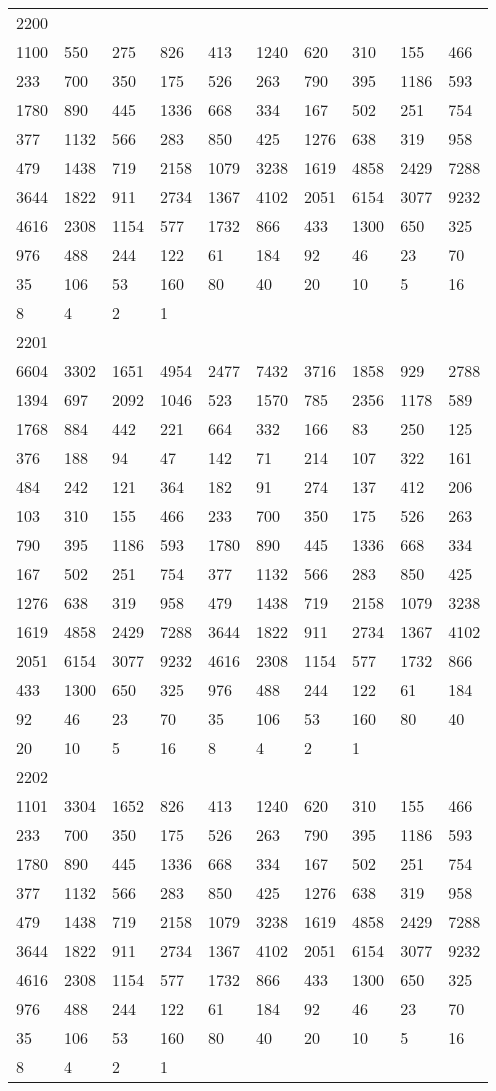 \begin{longtable}{*{10}{l}}
2200&&&&&&&&&\\
1100& 550& 275& 826& 413& 1240& 620& 310& 155& 466\\
233& 700& 350& 175& 526& 263& 790& 395& 1186& 593\\
1780& 890& 445& 1336& 668& 334& 167& 502& 251& 754\\
377& 1132& 566& 283& 850& 425& 1276& 638& 319& 958\\
479& 1438& 719& 2158& 1079& 3238& 1619& 4858& 2429& 7288\\
3644& 1822& 911& 2734& 1367& 4102& 2051& 6154& 3077& 9232\\
4616& 2308& 1154& 577& 1732& 866& 433& 1300& 650& 325\\
976& 488& 244& 122& 61& 184& 92& 46& 23& 70\\
35& 106& 53& 160& 80& 40& 20& 10& 5& 16\\
8& 4& 2& 1& \\

2201&&&&&&&&&\\
6604& 3302& 1651& 4954& 2477& 7432& 3716& 1858& 929& 2788\\
1394& 697& 2092& 1046& 523& 1570& 785& 2356& 1178& 589\\
1768& 884& 442& 221& 664& 332& 166& 83& 250& 125\\
376& 188& 94& 47& 142& 71& 214& 107& 322& 161\\
484& 242& 121& 364& 182& 91& 274& 137& 412& 206\\
103& 310& 155& 466& 233& 700& 350& 175& 526& 263\\
790& 395& 1186& 593& 1780& 890& 445& 1336& 668& 334\\
167& 502& 251& 754& 377& 1132& 566& 283& 850& 425\\
1276& 638& 319& 958& 479& 1438& 719& 2158& 1079& 3238\\
1619& 4858& 2429& 7288& 3644& 1822& 911& 2734& 1367& 4102\\
2051& 6154& 3077& 9232& 4616& 2308& 1154& 577& 1732& 866\\
433& 1300& 650& 325& 976& 488& 244& 122& 61& 184\\
92& 46& 23& 70& 35& 106& 53& 160& 80& 40\\
20& 10& 5& 16& 8& 4& 2& 1& \\

2202&&&&&&&&&\\
1101& 3304& 1652& 826& 413& 1240& 620& 310& 155& 466\\
233& 700& 350& 175& 526& 263& 790& 395& 1186& 593\\
1780& 890& 445& 1336& 668& 334& 167& 502& 251& 754\\
377& 1132& 566& 283& 850& 425& 1276& 638& 319& 958\\
479& 1438& 719& 2158& 1079& 3238& 1619& 4858& 2429& 7288\\
3644& 1822& 911& 2734& 1367& 4102& 2051& 6154& 3077& 9232\\
4616& 2308& 1154& 577& 1732& 866& 433& 1300& 650& 325\\
976& 488& 244& 122& 61& 184& 92& 46& 23& 70\\
35& 106& 53& 160& 80& 40& 20& 10& 5& 16\\
8& 4& 2& 1& \\


\end{longtable}
